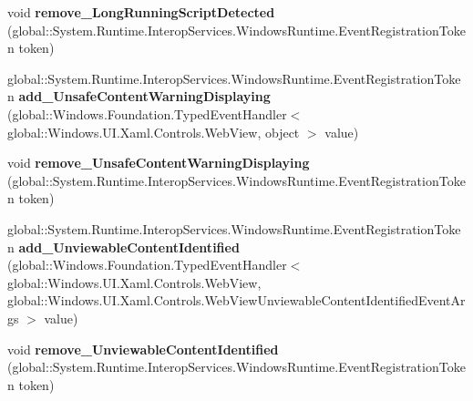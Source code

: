 \begin{DoxyCompactItemize}
\item 
\mbox{\label{interface_windows_1_1_u_i_1_1_xaml_1_1_controls_1_1_i_web_view2_af037b1883abb030235ed2cf192337825}} 
void {\bfseries remove\+\_\+\+Long\+Running\+Script\+Detected} (global\+::\+System.\+Runtime.\+Interop\+Services.\+Windows\+Runtime.\+Event\+Registration\+Token token)
\item 
\mbox{\label{interface_windows_1_1_u_i_1_1_xaml_1_1_controls_1_1_i_web_view2_acdcabb7c71e53867b288d8758f233b6e}} 
global\+::\+System.\+Runtime.\+Interop\+Services.\+Windows\+Runtime.\+Event\+Registration\+Token {\bfseries add\+\_\+\+Unsafe\+Content\+Warning\+Displaying} (global\+::\+Windows.\+Foundation.\+Typed\+Event\+Handler$<$ global\+::\+Windows.\+U\+I.\+Xaml.\+Controls.\+Web\+View, object $>$ value)
\item 
\mbox{\label{interface_windows_1_1_u_i_1_1_xaml_1_1_controls_1_1_i_web_view2_a3eb3a06e24cf2bd12de883bf81fb40d7}} 
void {\bfseries remove\+\_\+\+Unsafe\+Content\+Warning\+Displaying} (global\+::\+System.\+Runtime.\+Interop\+Services.\+Windows\+Runtime.\+Event\+Registration\+Token token)
\item 
\mbox{\label{interface_windows_1_1_u_i_1_1_xaml_1_1_controls_1_1_i_web_view2_a638c2029f3df84d7780aad5ec3492315}} 
global\+::\+System.\+Runtime.\+Interop\+Services.\+Windows\+Runtime.\+Event\+Registration\+Token {\bfseries add\+\_\+\+Unviewable\+Content\+Identified} (global\+::\+Windows.\+Foundation.\+Typed\+Event\+Handler$<$ global\+::\+Windows.\+U\+I.\+Xaml.\+Controls.\+Web\+View, global\+::\+Windows.\+U\+I.\+Xaml.\+Controls.\+Web\+View\+Unviewable\+Content\+Identified\+Event\+Args $>$ value)
\item 
\mbox{\label{interface_windows_1_1_u_i_1_1_xaml_1_1_controls_1_1_i_web_view2_a2882acdd93078aca17a084dda51aa7a7}} 
void {\bfseries remove\+\_\+\+Unviewable\+Content\+Identified} (global\+::\+System.\+Runtime.\+Interop\+Services.\+Windows\+Runtime.\+Event\+Registration\+Token token)
\item 
\mbox{\label{interface_windows_1_1_u_i_1_1_xaml_1_1_controls_1_1_i_web_view2_a23045b54a3bab5196d47fc172fd18d87}} 

\end{DoxyCompactItemize}
